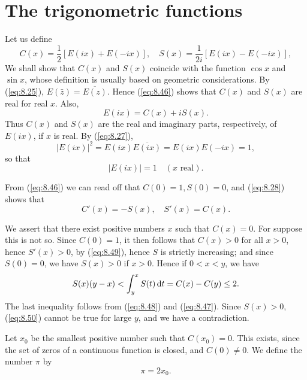 \section{The trigonometric functions}
Let us define
\begin{equation}
    \label{eq:8.46}
    C(x) = \frac{1}{2} \left[ E(ix) + E(-ix) \right],
    \quad 
    S(x) = \frac{1}{2i} \left[ E(ix) - E(-ix) \right],
\end{equation}
We shall show that $C(x)$ and $S(x)$ coincide with the function $\cos x$ and $\sin x$,
whose definition is usually based on geometric considerations.
By (\ref{eq:8.25}), $E(\bar{z})=\overline{E(z)}$.
Hence (\ref{eq:8.46}) shows that $C(x)$ and $S(x)$ are real for real $x$.
Also,
\begin{equation}
    \label{eq:8.47}
    E(ix) = C(x) + iS(x).
\end{equation}
Thus $C(x)$ and $S(x)$ are the real and imaginary parts, respectively,
of $E(ix)$, if $x$ is real. By (\ref{eq:8.27}),
\begin{equation*}
    \left| E(ix) \right|^2 
    = E(ix)\overline{E(ix)}
    = E(ix)E(-ix)
    = 1,
\end{equation*}
so that 
\begin{equation}
    \label{eq:8.48}
    \left| E(ix) \right| = 1
    \quad (x \text{ real}).
\end{equation}

From (\ref{eq:8.46}) we can read off that $C(0) = 1, S(0) = 0$, 
and (\ref{eq:8.28}) shows that 
\begin{equation}
    \label{eq:8.49}
    C'(x) = -S(x), \quad 
    S'(x) = C(x).
\end{equation}

We assert that there exist positive numbers $x$ such that $C(x) = 0$. 
For suppose this is not so. 
Since $C(0) = 1$, it then follows that $C(x) > 0$ for all $x > 0$, 
hence $S'(x) > 0$, by (\ref{eq:8.49}), hence $S$ is strictly increasing; 
and since $S(0) = 0$,
we have $S(x) > 0$ if $x > 0$. 
Hence if $0 < x < y$, we have
\begin{equation}
    \label{eq:8.50}
    S(x)(y - x) 
    < \int_{y}^{x} S(t) \d t
    = C(x) - C(y)
    \leq 2.
\end{equation}
The last inequality follows from (\ref{eq:8.48}) and (\ref{eq:8.47}).
Since $S(x) > 0$, (\ref{eq:8.50}) cannot be true for large $y$,
and we have a contradiction.

Let $x_0$ be the smallest positive number such that $C(x_0) = 0$. 
This exists, since the set of zeros of a continuous function is closed, 
and $C(0) \neq 0$. 
We define the number $\pi$ by
\begin{equation}
    \label{eq:8.51}
    \pi = 2 x_0.
\end{equation}

